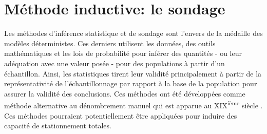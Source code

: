 \section{Méthode inductive: le sondage}\label{sec:statistical-inference}
    Les méthodes d'inférence statistique et de sondage sont l'envers de la médaille des modèles déterministes. Ces derniers utilisent les données, des outils mathématiques et les lois de probabilité pour inférer des quantités - ou leur adéquation avec une valeur posée - pour des populations à partir d'un échantillon. Ainsi, les statistiques tirent leur validité principalement à partir de la représentativité de l'échantillonnage par rapport à la base de la population pour assurer la validité des conclusions. Ces méthodes ont été développées comme méthode alternative au dénombrement manuel qui est apparue au XIX\textsuperscript{ième} siècle \parencite{ardilly_techniques_2006}. Ces méthodes pourraient potentiellement être appliquées pour induire des capacité de stationnement totales. 
